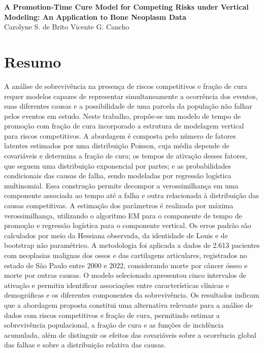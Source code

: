 \documentclass[11pt,a4paper]{article}
\begin{document}
\vspace{-0.8cm}
\begin{center}
    {\Large \textbf{A Promotion-Time Cure Model for Competing Risks under Vertical
Modeling: An Application to Bone Neoplasm Data}}\\[0.3cm]
    {\large Carolyne S. de Brito \quad Vicente G. Cancho}
\end{center}

\vspace{0.3cm}

\vspace{-0.8cm}

\section{Resumo}

A análise de sobrevivência na presença de riscos competitivos e fração de cura requer modelos capazes de representar simultaneamente a ocorrência dos eventos, suas diferentes causas e a possibilidade de uma parcela da população não falhar pelos eventos em estudo. Neste trabalho, propõe-se um modelo de tempo de promoção com fração de cura incorporado a estrutura de modelagem vertical para riscos competitivos. A abordagem é composta pelo número de fatores latentes estimados por uma distribuição Poisson, cuja média depende de covariáveis e determina a fração de cura; os tempos de ativação desses fatores, que seguem uma distribuição exponencial por partes; e as probabilidades condicionais das causas de falha, sendo modeladas por regressão logística multinomial. Essa construção permite decompor a verossimilhança em uma componente associada ao tempo até a falha e outra relacionada à distribuição das causas competitivas. A estimação dos parâmetros é realizada por máxima verossimilhança, utilizando o algoritmo EM para o componente de tempo de promoção e regressão logística para o componente vertical. Os erros padrão são calculados por meio da Hessiana observada, da identidade de Louis e de bootstrap não paramétrico. A metodologia foi aplicada a dados de 2.613 pacientes com neoplasias malignas dos ossos e das cartilagens articulares, registrados no estado de São Paulo entre 2000 e 2022, considerando morte por câncer ósseo e morte por outras causas. O modelo selecionado apresentou cinco intervalos de ativação e permitiu identificar associações entre características clínicas e demográficas e os diferentes componentes da sobrevivência.  Os resultados indicam que a abordagem proposta constitui uma alternativa relevante para a análise de dados com riscos competitivos e fração de cura, permitindo estimar a sobrevivência populacional, a fração de cura e as funções de incidência acumulada, além de distinguir os efeitos das covariáveis sobre a ocorrência global das falhas e sobre a distribuição relativa das causas.
\end{document}
